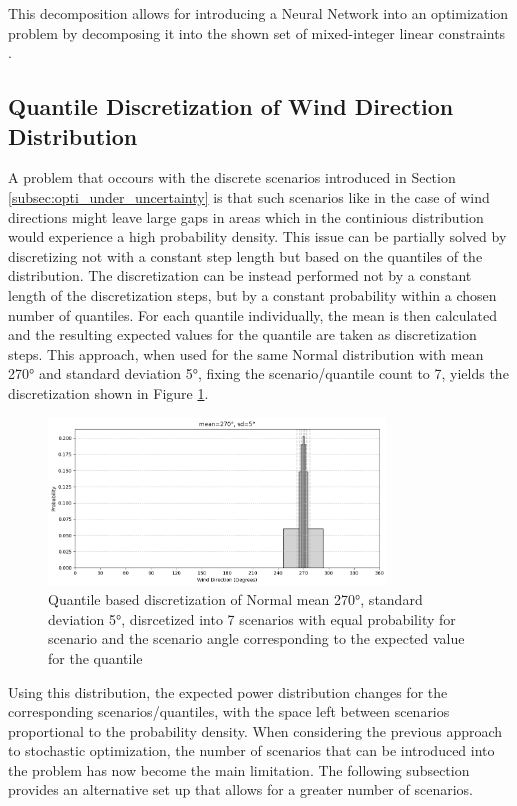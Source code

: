 \documentclass[preprint,12pt]{elsarticle}
\begin{document}
This decomposition allows for introducing a Neural Network into an optimization problem by decomposing it into the shown set of mixed-integer linear constraints \cite{ALCANTARA2023120895}.


\subsection{Quantile Discretization of Wind Direction Distribution } \label{subsubsection: discretization}

A problem that occours with the discrete scenarios introduced in Section \ref{subsec:opti_under_uncertainty} is that such scenarios like in the case of wind directions might leave large gaps in areas which in the continious distribution would experience a high probability density. This issue can be partially solved by discretizing not with a constant step length but based on the quantiles of the distribution. The discretization can be instead performed not by a constant length of the discretization steps, but by a constant probability within a chosen number of quantiles. For each quantile individually, the mean is then calculated and the resulting expected values for the quantile are taken as discretization steps. This approach, when used for the same Normal distribution with mean 270° and standard deviation 5°, fixing the scenario/quantile count to 7, yields the discretization shown in Figure \ref{fig:wind_dist_opti_quantiles}. 

\begin{figure}[h] 
	\centering
	\includegraphics[width=0.8\textwidth]{../figures/optimization/wind_dist_opti_quantiles.png} 
	\caption{Quantile based discretization of Normal mean 270°,  standard deviation 5°, disrcetized into 7 scenarios with equal probability for scenario and the scenario angle corresponding to the expected value for the quantile }
	\label{fig:wind_dist_opti_quantiles}
\end{figure} 

Using this distribution, the expected power distribution changes for the corresponding scenarios/quantiles, with the space left between scenarios proportional to the probability density. When considering the previous approach to stochastic optimization, the number of scenarios that can be introduced into the problem has now become the main limitation. The following subsection provides an alternative set up that allows for a greater number of scenarios.
\end{document}
